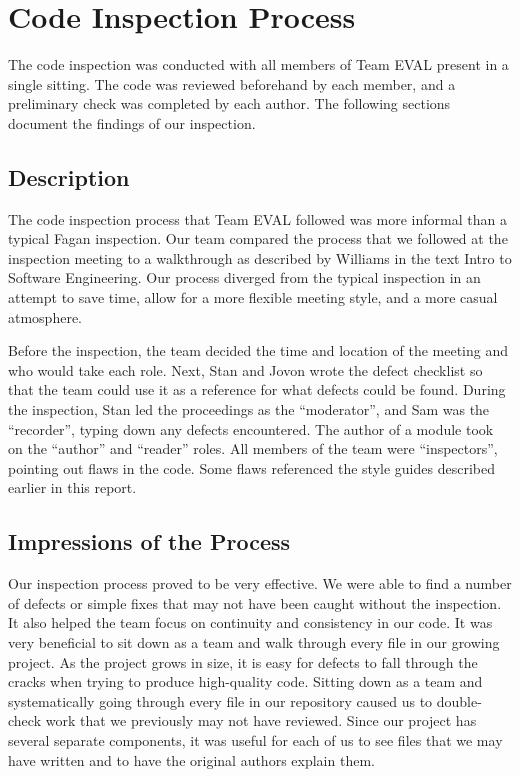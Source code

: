 \documentclass{article}
\begin{document}
\section{Code Inspection Process}

The code inspection was conducted with all members of Team EVAL present in a single sitting. The code was reviewed beforehand by each member, and a preliminary check was completed by each author. The following sections document the findings of our inspection.

\subsection{Description}

The code inspection process that Team EVAL followed was more informal than a typical Fagan inspection. Our team compared the process that we followed at the inspection meeting to a walkthrough as described by Williams in the text Intro to Software Engineering. Our process diverged from the typical inspection in an attempt to save time, allow for a more flexible meeting style, and a more casual atmosphere.

Before the inspection, the team decided the time and location of the meeting and who would take each role. Next, Stan and Jovon wrote the defect checklist so that the team could use it as a reference for what defects could be found. During the inspection, Stan led the proceedings as the ``moderator'', and Sam was the ``recorder'', typing down any defects encountered. The author of a module took on the ``author'' and ``reader'' roles. All members of the team were ``inspectors'', pointing out flaws in the code. Some flaws referenced the style guides described earlier in this report.

\subsection{Impressions of the Process}

Our inspection process proved to be very effective. We were able to find a number of defects or simple fixes that may not have been caught without the inspection. It also helped the team focus on continuity and consistency in our code. It was very beneficial to sit down as a team and walk through every file in our growing project. As the project grows in size, it is easy for defects to fall through the cracks when trying to produce high-quality code.  Sitting down as a team and systematically going through every file in our repository caused us to double-check work that we previously may not have reviewed. Since our project has several separate components, it was useful for each of us to see files that we may have written and to have the original authors explain them.
\end{document}

